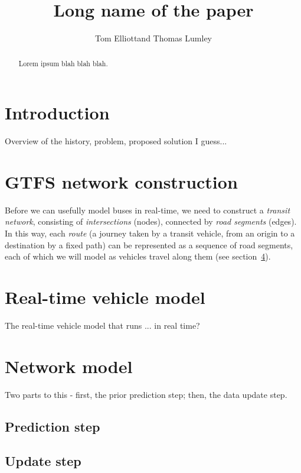 \documentclass[times, doublespace]{anzsauth}
\begin{document}
\cleanlookdateon
{}
\title{Long name of the paper}
\author{Tom Elliott\corrauth and Thomas Lumley}
\address{
    Department of Statistics, University of Auckland, Private Bag 92019, Auckland 1142, New Zealand\\
    Email: \texttt{tom.elliott@auckland.ac.nz}
}

\begin{abstract}
Lorem ipsum blah blah blah.
\end{abstract}


\maketitle
\section{Introduction}
\label{sec:intro}

Overview of the history, problem, proposed solution I guess...


\section{GTFS network construction}
\label{sec:gtfs}

Before we can usefully model buses in real-time, 
we need to construct a \emph{transit network}, 
consisting of \emph{intersections} (nodes),
connected by \emph{road segments} (edges).
In this way, each \emph{route} 
(a journey taken by a transit vehicle, from an origin to a destination by a fixed path)
can be represented as a sequence of road segments,
each of which we will model as vehicles travel along them (see section~\ref{sec:kf}).


\section{Real-time vehicle model}
\label{sec:pf}

The real-time vehicle model that runs ... in real time?


\section{Network model}
\label{sec:kf}

Two parts to this - first, the prior prediction step; then, the data update step.

\subsection{Prediction step}
\label{sec:kf-pred}



\subsection{Update step}
\label{sec:kf-update}
\end{document}
